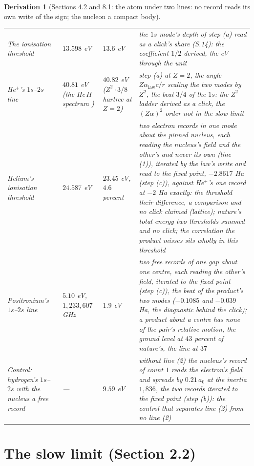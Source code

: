 \documentclass[pdflatex,sn-mathphys-num]{sn-jnl}
\theoremstyle{thmstyleone}
\newtheorem{derivation}{Derivation}
\begin{document}
\begin{derivation}[Sections 4.2 and 8.1: the atom under two lines: no record reads its own write of the sign; the nucleon a compact body]
\begin{center}
\begin{tabular}{p{2.0cm}p{2.4cm}p{1.8cm}p{5.1cm}}
The ionisation threshold & $13.598$ eV \cite{nist} & $13.6$ eV & the $1s$ mode's depth of step (a) read as a click's share (S.14): the coefficient $1 / 2$ derived, the eV through the unit\\
He$^+$'s $1s$--$2s$ line & $40.81$ eV (the He\,II spectrum \cite{nist}) & $40.82$ eV ($Z^2 \cdot 3 / 8$ hartree at $Z = 2$) & step (a) at $Z = 2$, the angle $Z\alpha_{\mathrm{law}}c / r$ scaling the two modes by $Z^2$, the beat $3 / 4$ of the $1s$: the $Z^2$ ladder derived as a click, the $(Z\alpha)^2$ order not in the slow limit\\
Helium's ionisation threshold & $24.587$ eV \cite{nist} & $23.45$ eV, $4.6$ percent & two electron records in one mode about the pinned nucleus, each reading the nucleus's field and the other's and never its own (line (1)), iterated by the law's write and read to the fixed point, $-2.8617$ Ha (step (c)), against He$^+$'s one record at $-2$ Ha exactly: the threshold their difference, a comparison and no click claimed (lattice); nature's total energy two thresholds summed and no click; the correlation the product misses sits wholly in this threshold\\
Positronium's $1s$--$2s$ line & $5.10$ eV, $1{,}233{,}607$ GHz \cite{fee} & $1.9$ eV & two free records of one gap about one centre, each reading the other's field, iterated to the fixed point (step (c)), the beat of the product's two modes ($-0.1085$ and $-0.039$ Ha, the diagnostic behind the click); a product about a centre has none of the pair's relative motion, the ground level at $43$ percent of nature's, the line at $37$\\
Control: hydrogen's $1s$--$2s$ with the nucleus a free record & --- & $9.59$ eV & without line (2) the nucleus's record of count $1$ reads the electron's field and spreads by $0.21\,a_0$ at the inertia $1{,}836$, the two records iterated to the fixed point (step (b)): the control that separates line (2) from no line (2)\\
\hline
\end{tabular}\end{center}
\end{derivation}





\section*{The slow limit (Section 2.2)}
\end{document}
